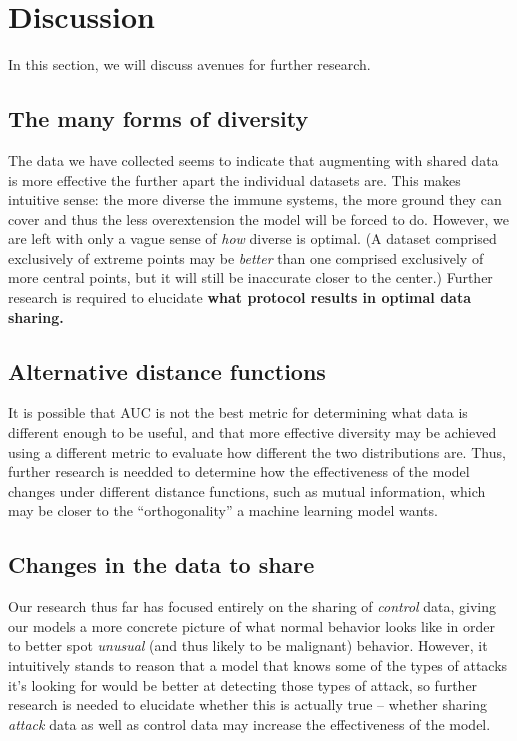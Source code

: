 \section{Discussion}
\label{sec:discussion}

In this section, we will discuss avenues for further research.

\subsection{The many forms of diversity}

    The data we have collected seems to indicate that augmenting with shared data is more effective the further apart the individual datasets are. This makes intuitive sense: the more diverse the immune systems, the more ground they can cover and thus the less overextension the model will be forced to do. However, we are left with only a vague sense of \textit{how} diverse is optimal. (A dataset comprised exclusively of extreme points may be \textit{better} than one comprised exclusively of more central points, but it will still be inaccurate closer to the center.) Further research is required to elucidate \textbf{what protocol results in optimal data sharing.}
    
\subsection{Alternative distance functions}
    
    It is possible that AUC is not the best metric for determining what data is different enough to be useful, and that more effective diversity may be achieved using a different metric to evaluate how different the two distributions are. Thus, further research is needded to determine how the effectiveness of the model changes under different distance functions, such as mutual information, which may be closer to the ``orthogonality'' a machine learning model wants.
    
\subsection{Changes in the data to share}

    Our research thus far has focused entirely on the sharing of \textit{control} data, giving our models a more concrete picture of what normal behavior looks like in order to better spot \textit{unusual} (and thus likely to be malignant) behavior. However, it intuitively stands to reason that a model that knows some of the types of attacks it's looking for would be better at detecting those types of attack, so further research is needed to elucidate whether this is actually true -- whether sharing \textit{attack} data as well as control data may increase the effectiveness of the model.
    
